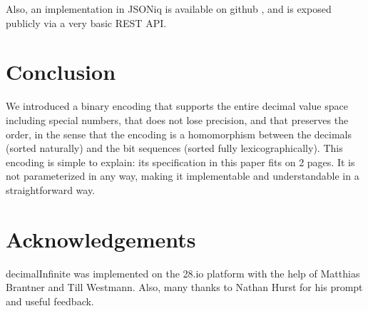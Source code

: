 \documentclass{acm_proc_article-sp}
\begin{document}
Also, an implementation in JSONiq is available on github \cite{decimalInfiniteJSONiq}, and is exposed publicly via a very basic REST API.

\section{Conclusion}

We introduced a binary encoding that supports the entire decimal value space including special numbers, that does not lose precision, and that preserves the order, in the sense that the encoding is a homomorphism between the decimals (sorted naturally) and the bit sequences (sorted fully lexicographically). This encoding is simple to explain: its specification in this paper fits on 2 pages. It is not parameterized in any way, making it implementable and understandable in a straightforward way.

\section{Acknowledgements}
decimalInfinite was implemented on the 28.io platform with the help of Matthias Brantner and Till Westmann. Also, many thanks to Nathan Hurst for his prompt and useful feedback.



\end{document}

